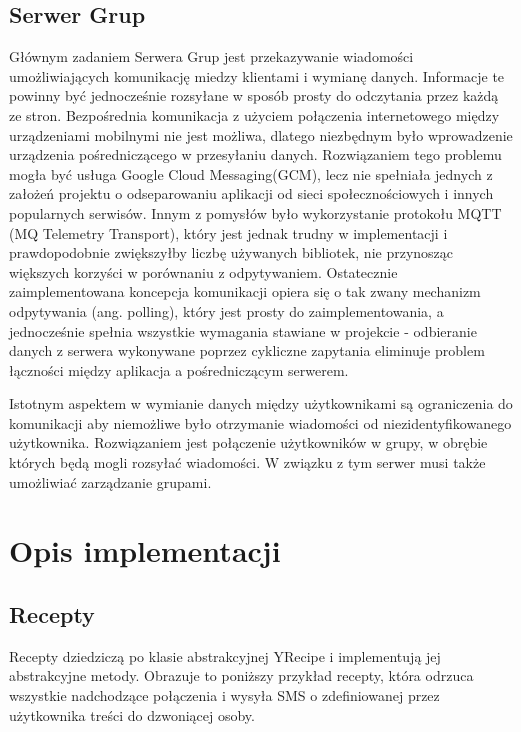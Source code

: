 \documentclass[11pt,a4paper,polish,thesis]{dcsbook}
\begin{document}
\section{Serwer Grup}
Głównym zadaniem Serwera Grup jest przekazywanie wiadomości umożliwiających komunikację miedzy klientami i wymianę danych. 
Informacje te powinny być jednocześnie rozsyłane w sposób prosty do odczytania przez każdą ze stron.
Bezpośrednia komunikacja z użyciem połączenia internetowego między urządzeniami mobilnymi nie jest możliwa, dlatego niezbędnym było wprowadzenie urządzenia pośredniczącego w przesyłaniu danych. 
Rozwiązaniem tego problemu mogła być usługa Google Cloud Messaging(GCM), lecz nie spełniała jednych z założeń projektu o odseparowaniu aplikacji od sieci społecznościowych i innych popularnych serwisów.
Innym z pomysłów było wykorzystanie protokołu MQTT (MQ Telemetry Transport), który jest jednak trudny w implementacji i prawdopodobnie zwiększyłby liczbę używanych bibliotek, nie przynosząc większych korzyści w porównaniu z odpytywaniem.
Ostatecznie zaimplementowana koncepcja komunikacji opiera się o tak zwany mechanizm odpytywania (ang. polling), który jest prosty do zaimplementowania, a jednocześnie spełnia wszystkie wymagania stawiane w projekcie - odbieranie danych z serwera wykonywane poprzez cykliczne zapytania eliminuje problem łączności między aplikacja a pośredniczącym serwerem.

Istotnym aspektem w wymianie danych między użytkownikami są ograniczenia do komunikacji aby niemożliwe było otrzymanie wiadomości od niezidentyfikowanego użytkownika.
Rozwiązaniem jest połączenie użytkowników w grupy, w obrębie których będą mogli rozsyłać wiadomości. W związku z tym serwer musi także umożliwiać zarządzanie grupami.

\chapter{Opis implementacji}

\section{Recepty}
Recepty dziedziczą po klasie abstrakcyjnej YRecipe i implementują jej abstrakcyjne metody. Obrazuje to poniższy przykład recepty, która odrzuca wszystkie nadchodzące połączenia i wysyła SMS o zdefiniowanej przez użytkownika treści do dzwoniącej osoby.
\end{document}
